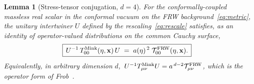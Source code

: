 \documentclass[11pt]{article}
\newtheorem{lemma}{Lemma}[section]
\begin{document}
\begin{lemma}[Stress-tensor conjugation, $d=4$]\label{lem:33}
For the conformally-coupled massless real scalar in the conformal vacuum on
the FRW background~\eqref{eq:metric}, the unitary intertwiner $U$ defined by
the rescaling~\eqref{eq:rescale} satisfies, as an identity of operator-valued
distributions on the common Cauchy surface,
\begin{equation}
\boxed{\,
   U^{-1}\,T^{\rm Mink}_{00}(\eta,\mathbf{x})\,U
   \;=\; a(\eta)^{\,2}\;\mathcal{T}^{\rm FRW}_{00}(\eta,\mathbf{x}).
\,}
   \label{eq:lemma}
\end{equation}
Equivalently, in arbitrary dimension $d$,
$\,U^{-1}T^{\rm Mink}_{\mu\nu}U=
a^{\,d-2}\mathcal{T}^{\rm FRW}_{\mu\nu}$, which is the operator form of
Frob~\cite[eq.~(3.8)]{Frob2023}.
\end{lemma}
\end{document}

